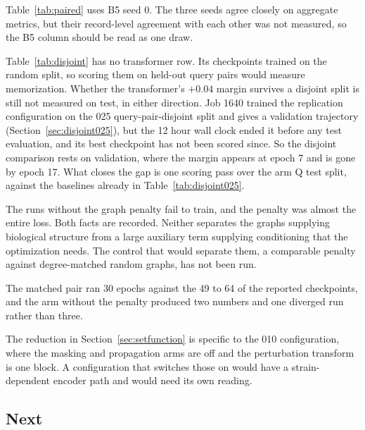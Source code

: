 Table~\ref{tab:paired} uses B5 seed 0. The three seeds agree closely on
aggregate metrics, but their record-level agreement with each other was not
measured, so the B5 column should be read as one draw.

Table~\ref{tab:disjoint} has no transformer row. Its checkpoints trained on the
random split, so scoring them on held-out query pairs would measure memorization.
Whether the transformer's $+0.04$ margin survives a disjoint split is still not
measured on test, in either direction. Job 1640 trained the replication
configuration on the 025 query-pair-disjoint split and gives a validation
trajectory (Section~\ref{sec:disjoint025}), but the 12 hour wall clock ended it
before any test evaluation, and its best checkpoint has not been scored since.
So the disjoint comparison rests on validation, where the margin appears at
epoch 7 and is gone by epoch 17. What closes the gap is one scoring pass over
the arm Q test split, against the baselines already in
Table~\ref{tab:disjoint025}.

The runs without the graph penalty fail to train, and the penalty was almost the
entire loss. Both facts are recorded. Neither separates the graphs supplying
biological structure from a large auxiliary term supplying conditioning that the
optimization needs. The control that would separate them, a comparable penalty
against degree-matched random graphs, has not been run.

The matched pair ran 30 epochs against the 49 to 64 of the reported checkpoints,
and the arm without the penalty produced two numbers and one diverged run rather
than three.

The reduction in Section~\ref{sec:setfunction} is specific to the 010
configuration, where the masking and propagation arms are off and the
perturbation transform is one block. A configuration that switches those on
would have a strain-dependent encoder path and would need its own reading.

\subsection{Next}

